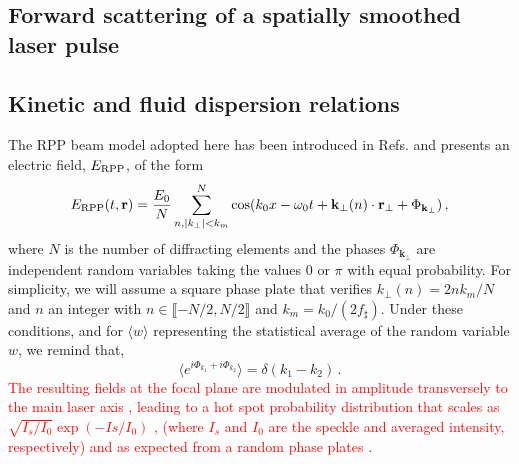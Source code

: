 \documentclass[
 reprint,
 superscriptaddress,
 amsmath,amssymb,
 aps,
]{revtex4-1}
\def\tc{\textcolor{red}}
\begin{document}
 \begin{widetext}
\section{Forward scattering of a spatially smoothed laser pulse}
\subsection{Kinetic and fluid dispersion relations}\label{sec:diperpp}
The RPP beam model adopted here has been introduced in  Refs. \cite[]{POF_Schmitt_88,POF_Rose_93} and presents an electric field, $E_{\rm RPP}$, of the form
 \begin{align}
E_{\rm RPP}(t,\mathbf{r})  = \frac{E_0}{N} \sum_{n,\vert k_{\perp}\vert<k_m }^N  \cos(k_0x - \omega_0t +\mathbf{k}_\perp(n) \cdot \mathbf{r}_\perp +\Phi_{\mathbf{k}_\perp})\, , \label{eq:erpp}
 \end{align}
 where  $N$ is the number of diffracting elements and the phases $\Phi_{\mathbf{k}_\perp}$ are  independent random variables taking the values $0$ or $\pi$ with equal probability.
 For simplicity, we will assume a square phase plate that verifies $k_{\perp}(n) = 2nk_m/N$ and  $n$ an integer with $n\in \llbracket - N/2 ,N/2 \rrbracket$ and $k_m = k_0/(2f_\sharp)$. 
 Under these conditions, and for $\langle w\rangle$ representing the statistical average of the random variable $w$,  we remind that,
 \begin{equation}\label{eq:d}
 \langle e^{i\Phi_{k_1}+i\Phi_{k_2}}\rangle=\delta(k_1-k_2) \, . 
 \end{equation}
 \tc{The resulting  fields at the focal plane  are modulated in amplitude transversely to the main laser axis  \cite[]{Kato_1984}, leading to a hot spot probability distribution that scales as $\sqrt{I_s/I_0}\exp(-Is/I_0) $ \cite[]{POF_Rose_93}, (where $I_s$ and $I_0$ are the speckle and averaged intensity, respectively) and as expected from a random phase plates \cite[]{Garnier_1999}}.


\end{widetext}
\end{document}
